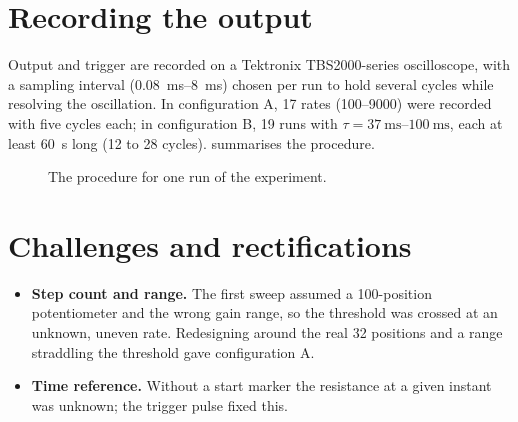 \section{Recording the output}\label{sec:acquisition}

Output and trigger are recorded on a Tektronix TBS2000-series oscilloscope, with a sampling interval
(\SIrange{0.08}{8}{\milli\second}) chosen per run to hold several cycles while resolving the
oscillation. In configuration A, 17 rates (\SIrange{100}{9000}{\ohmpersec}) were recorded with five
cycles each; in configuration B, 19 runs with $\tau=\SIrange{37}{100}{\milli\second}$, each at least
\SI{60}{\second} long (12 to 28 cycles).  summarises the procedure.

\begin{figure}[!htb]
\centering
{}
\caption[Procedure for one run]{The procedure for one run of the experiment.}
\label{fig:procedure}
\end{figure}

\section{Challenges and rectifications}\label{sec:challenges}

\begin{itemize}
  \item \textbf{Step count and range.} The first sweep assumed a 100-position potentiometer and the wrong
        gain range, so the threshold was crossed at an unknown, uneven rate. Redesigning around the real
        32 positions and a range straddling the threshold gave configuration A.
  \item \textbf{Time reference.} Without a start marker the resistance at a given instant was unknown;
        the trigger pulse fixed this.
\end{itemize}

